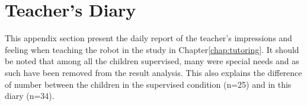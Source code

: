 \cleartooddpage
\chapter{Teacher's Diary} \label{app:diary}
This appendix section present the daily report of the teacher's impressions and feeling when teaching the robot in the study in Chapter\ref{chap:tutoring}. It should be noted that among all the children supervised, many were special needs and as such have been removed from the result analysis. This also explains the difference of number between the children in the supervised condition (n=25) and in this diary (n=34).

%
